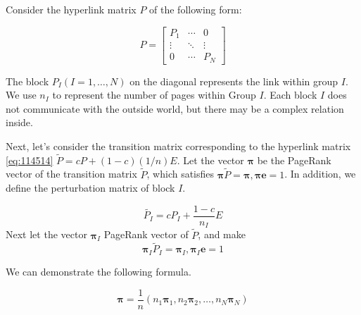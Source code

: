 \documentclass[lettersize,journal,12pt]{IEEEtran}
\begin{document}
Consider the hyperlink matrix $P$ of the following form:

\begin{equation}
	\label{eq:114514}
	P=
	\begin{bmatrix}
		P_1    & \cdots & 0      \\
		\vdots & \ddots & \vdots \\
		0      & \cdots & P_N
	\end{bmatrix}
\end{equation}

The block $ P_I (I = 1, \ldots, N)$ on the diagonal represents the link within group $I$. We use $n_I$ to represent the number of pages within Group $I$. Each block $I$ does not communicate with the outside world, but there may be a complex relation inside.

Next, let's consider the transition matrix corresponding to the hyperlink matrix \eqref{eq:114514} $\widetilde{P} = cP  + (1-c)(1/n)E$. Let the vector $\boldsymbol{\pi}$ be the PageRank vector of the transition matrix $\widetilde{P}$, which satisfies $\boldsymbol{\pi}\widetilde{P}=\boldsymbol{\pi}, \boldsymbol{\pi e}=1$. In addition, we define the perturbation matrix of block $I$.

\begin{equation}
	\widetilde{P_I}
	=cP_I + \frac{1-c}{n_I}E
\end{equation}
Next let the vector $\boldsymbol{\pi}_I$
PageRank vector of $\widetilde{P}$, and make
\begin{equation}
	\boldsymbol{\pi}_I\widetilde{P}_I = \boldsymbol{\pi}_I, \boldsymbol{\pi}_I\boldsymbol{e}=1
\end{equation}

We can demonstrate the following formula.

\begin{equation}
	\label{eq:4444}
	\boldsymbol{\pi}=\frac{1}{n}(n_1\boldsymbol{\pi}_1,  n_2\boldsymbol{\pi}_2,\ldots,n_N\boldsymbol{\pi}_N)
\end{equation}
\end{document}
